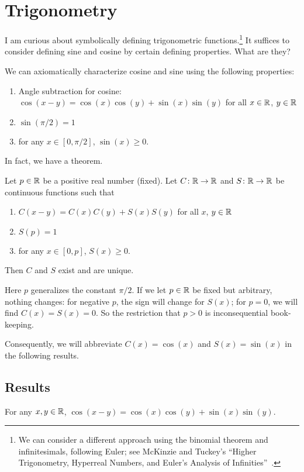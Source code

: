 \chapter{Trigonometry}

\M I am curious about symbolically defining trigonometric
functions.\footnote{We can consider a different approach using the
binomial theorem and infinitesimals, following Euler; see McKinzie and
Tuckey's ``Higher Trigonometry, Hyperreal Numbers, and Euler’s Analysis of Infinities''~\cite{mckinzie}.} It
suffices to consider defining sine and cosine by certain defining
properties. What are they?

We can axiomatically characterize cosine and sine using the following
properties:
\begin{enumerate}
\item Angle subtraction for cosine: $\cos(x-y) = \cos(x)\cos(y) + \sin(x)\sin(y)$ for all $x\in\mathbb{R}$, $y\in\mathbb{R}$
\item $\sin(\pi/2)=1$
\item for any $x\in[0,\pi/2]$, $\sin(x)\geq0$.
\end{enumerate}
In fact, we have a theorem.

\begin{theorem}
Let $p\in\mathbb{R}$ be a positive real number (fixed). Let $C\colon\mathbb{R}\to\mathbb{R}$
and $S\colon\mathbb{R}\to\mathbb{R}$ be continuous functions such that
\begin{enumerate}
\item $C(x-y) = C(x)C(y) + S(x)S(y)$ for all $x$, $y\in\mathbb{R}$
\item $S(p)=1$
\item for any $x\in[0,p]$, $S(x)\geq0$.
\end{enumerate}
Then $C$ and $S$ exist and are unique.
\end{theorem}

Here $p$ generalizes the constant $\pi/2$. If we let $p\in\mathbb{R}$ be fixed
but arbitrary, nothing changes: for negative $p$, the sign will change
for $S(x)$; for $p=0$, we will find $C(x)=S(x)=0$. So the restriction
that $p>0$ is inconsequential book-keeping.

Consequently, we will abbreviate $C(x)=\cos(x)$ and $S(x)=\sin(x)$ in
the following results.

\section{Results}

\begin{axiom}\label{axiom:trigonometry:cos-addition-law}
For any $x,y\in\mathbb{R}$,  $\cos(x-y) = \cos(x)\cos(y) + \sin(x)\sin(y)$.
\end{axiom}

